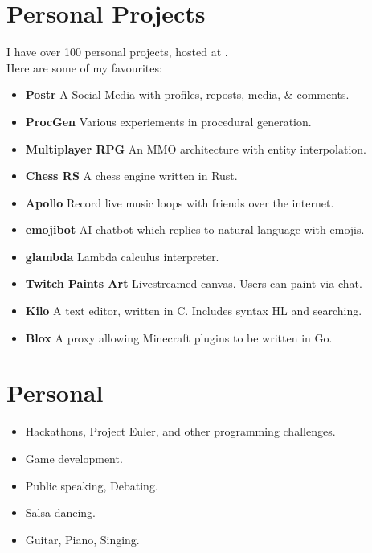 \documentclass{jcgcv}
\begin{document}
\begin{column}
  \section{Personal Projects}
  I have over 100 personal projects, hosted at
  .\\
  Here are some of my favourites:
  \begin{itemize}
    \item \textbf{Postr} A Social Media with profiles, reposts, media, \& comments.
    \item \textbf{ProcGen} Various experiements in procedural generation.
    \item \textbf{Multiplayer RPG} An MMO architecture with entity interpolation.
    \item \textbf{Chess RS} A chess engine written in Rust.
    \item \textbf{Apollo} Record live music loops with friends over the internet.
    \item \textbf{emojibot} AI chatbot which replies to natural language with emojis.
    \item \textbf{glambda} Lambda calculus interpreter.
    \item \textbf{Twitch Paints Art} Livestreamed canvas. Users can paint via chat.
    \item \textbf{Kilo} A text editor, written in C. Includes syntax HL and searching.
    \item \textbf{Blox} A proxy allowing Minecraft plugins to be written in Go.
  \end{itemize}

  \section{Personal}
  \begin{itemize}
    \item Hackathons, Project Euler, and other programming challenges.
    \item Game development.
    \item Public speaking, Debating.
    \item Salsa dancing.
    \item Guitar, Piano, Singing.
  \end{itemize}

\end{column}
\end{document}
